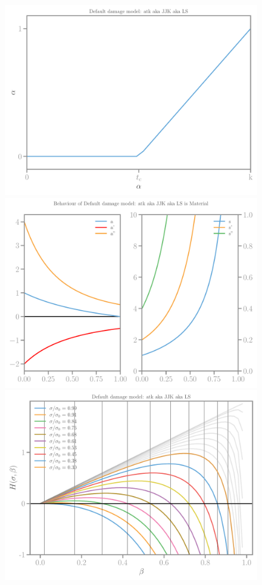 \documentclass[]{article}
\begin{document}
\begin{figure}[htbp]
  \centering
  \includegraphics[width=.33\textheight]{../figures/atk-alpha-homog.pdf}
  \includegraphics[width=.33\textheight]{../figures/atk-model.pdf}
  \includegraphics[width=.33\textheight]{../figures/atk-Hbeta.pdf}

\end{figure}
\end{document}
